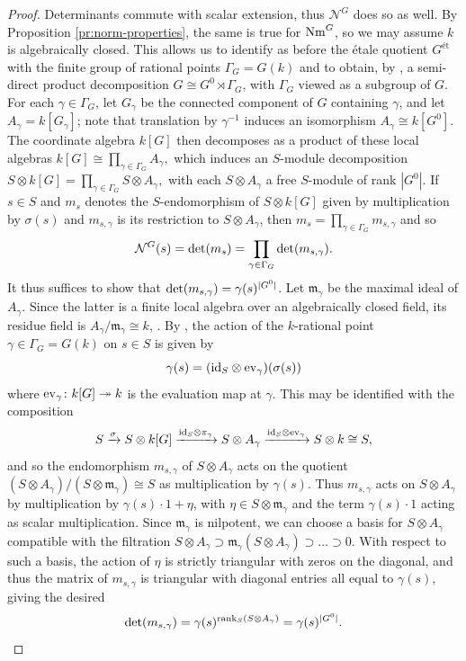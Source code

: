 \documentclass[12pt]{amsart}
\theoremstyle{definition}
\begin{document}
\begin{proof}
	Determinants commute with scalar extension, thus $\mathcal{N}^G$ does so as well. By Proposition \ref{pr:norm-properties}, the same is true for ${\rm Nm}^G$, so we may assume $k$ is algebraically closed. This allows us to identify as before the \'etale quotient $G^{\text{\'et}}$ with the finite group of rational points $\Gamma_G=G(k)$ and to obtain, by \cite[6.8]{MR547117}, a semi-direct product decomposition $G \cong G^0 \rtimes \Gamma_G$, with $\Gamma_G$  viewed as a subgroup of $G$. For each $\gamma \in \Gamma_G$, let $G_\gamma$ be the connected component of $G$ containing $\gamma$, and let $A_\gamma = k[G_\gamma]$; note that translation by $\gamma^{-1}$ induces an isomorphism $A_\gamma \cong k[G^0]$. The coordinate algebra $k[G]$ then decomposes as a product of these local algebras
	$
	k[G]\cong \prod_{\gamma\in\Gamma_G} A_\gamma,
	$
	which induces an $S$-module decomposition
	$
	S\otimes k[G]=\prod_{\gamma\in\Gamma_G}S\otimes A_\gamma,
	$
	with each $S\otimes A_\gamma$ a free $S$-module of rank $|G^0|$. If $s \in S$ and $m_s$ denotes the $S$-endomorphism of $S\otimes k[G]$ given by multiplication by $\sigma(s)$ and $m_{s,\gamma}$ is its restriction to $S\otimes A_\gamma$, then  
	$
	m_s=\prod_{\gamma\in\Gamma_G} m_{s,\gamma}
	$
	and so
	\[
	{\mathcal{N}}^G(s)={\rm det}(m_s)=\prod_{\gamma\in\Gamma_G} {\rm det}(m_{s,\gamma}).
	\]
	It thus suffices to show that ${\rm det}(m_{s,\gamma})=\gamma(s)^{|G^0|}$. Let $\mathfrak{m}_\gamma$ be the maximal ideal of $A_\gamma$. Since the latter is a finite local algebra over an algebraically closed field, its residue field is $A_\gamma/\mathfrak{m}_\gamma \cong k$, \cite[7.9]{Atiyah}. By  \cite[I.2.8]{MR2015057}, the action of the $k$-rational point  $\gamma\in\Gamma_G=G(k)$ on $s\in S$ is given by
	\[
	\gamma(s) = ({\rm id}_S \otimes {\rm ev}_\gamma)(\sigma(s))
	\]
	where ${\rm ev}_\gamma\colon k[G]\twoheadrightarrow k$ is the evaluation map at $\gamma$. This may be identified with the composition
	\[
	S\xrightarrow{\sigma} S\otimes k[G] \xrightarrow{{\rm id}_S\otimes\pi_\gamma} S\otimes A_\gamma \xrightarrow{{\rm id}_S\otimes {\rm ev}_\gamma} S\otimes k \cong S,
	\]
	and so the endomorphism $m_{s,\gamma}$ of $S\otimes A_\gamma$ acts on the quotient  $(S\otimes A_\gamma)/(S\otimes \mathfrak{m}_\gamma)\cong S$ as multiplication by $\gamma(s)$. Thus $m_{s,\gamma}$ acts on $S\otimes A_\gamma$ by multiplication by $\gamma(s)\cdot 1 + \eta$, with  $\eta\in S\otimes \mathfrak{m}_\gamma$ and the term $\gamma(s)\cdot 1$ acting as scalar multiplication. Since $\mathfrak{m}_\gamma$ is nilpotent, we can choose a basis for $S\otimes A_\gamma$ compatible with the filtration $S\otimes A_\gamma \supset \mathfrak{m}_\gamma (S\otimes A_\gamma) \supset \dots \supset 0$. With respect to such a basis, the action of $\eta$ is strictly triangular with zeros on the diagonal, and thus the matrix of $m_{s,\gamma}$ is triangular with diagonal entries all equal to $\gamma(s)$, giving the desired
	\[
	{\rm det}(m_{s,\gamma})=\gamma(s)^{{\rm rank}_S(S\otimes A_\gamma)}=\gamma(s)^{|G^0|}.
	\]
\end{proof}
\end{document}
